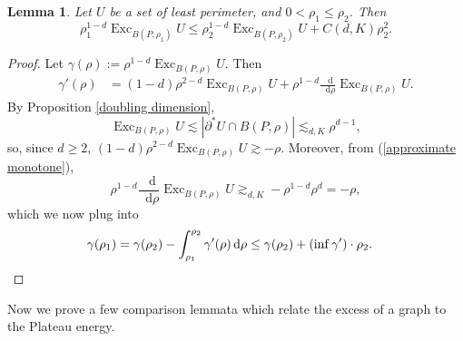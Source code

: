 \documentclass[reqno,10pt]{amsart}
\DeclareMathOperator{\Exc}{Exc}
\newcommand*\dif{\mathop{}\!\mathrm{d}}
\newtheorem{lemma}[theorem]{Lemma}
\theoremstyle{definition}
\numberwithin{equation}{section}
\begin{document}
\begin{lemma}\label{monotonicity formula for excess}
Let $U$ be a set of least perimeter, and $0 < \rho_1 \leq \rho_2$. Then 
$$\rho_1^{1 - d} \Exc_{B(P, \rho_1)} U \leq \rho_2^{1 - d} \Exc_{B(P, \rho_2)} U + C(d, K) \rho_2^2.$$
\end{lemma}
\begin{proof}
Let $\gamma(\rho) := \rho^{1 - d} \Exc_{B(P, \rho)} U$.
Then
\begin{align*}
\gamma'(\rho) &= (1 - d) \rho^{2 - d} \Exc_{B(P, \rho)} U + \rho^{1 - d} \frac{\dif}{\dif \rho} \Exc_{B(P, \rho)} U.
\end{align*}
By Proposition \ref{doubling dimension},
$$\Exc_{B(P, \rho)} U \lesssim |\partial^* U \cap B(P, \rho)| \lesssim_{d, K} \rho^{d - 1},$$
so, since $d \geq 2$, $(1 - d) \rho^{2 - d} \Exc_{B(P, \rho)} U \gtrsim - \rho$.
Moreover, from (\ref{approximate monotone}),
$$\rho^{1 - d} \frac{\dif}{\dif \rho} \Exc_{B(P, \rho)} U \gtrsim_{d, K} -\rho^{1 - d} \rho^d = -\rho,$$
which we now plug into
\begin{align*}
\gamma(\rho_1) &= \gamma(\rho_2) - \int_{\rho_1}^{\rho_2} \gamma'(\rho) \dif \rho \leq \gamma(\rho_2) + (\inf \gamma') \cdot \rho_2.
\qedhere 
\end{align*}
\end{proof}

Now we prove a few comparison lemmata which relate the excess of a graph to the Plateau energy.
\end{document}
